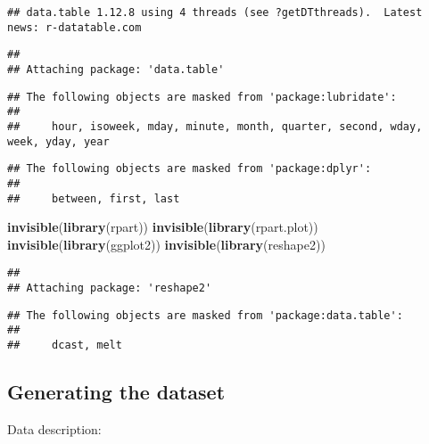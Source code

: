 \documentclass[
]{article}
\newenvironment{Shaded}{\begin{snugshade}}{\end{snugshade}}
\newcommand{\KeywordTok}[1]{\textcolor[rgb]{0.13,0.29,0.53}{\textbf{#1}}}
\newcommand{\NormalTok}[1]{#1}
\begin{document}
\begin{verbatim}
## data.table 1.12.8 using 4 threads (see ?getDTthreads).  Latest news: r-datatable.com
\end{verbatim}

\begin{verbatim}
## 
## Attaching package: 'data.table'
\end{verbatim}

\begin{verbatim}
## The following objects are masked from 'package:lubridate':
## 
##     hour, isoweek, mday, minute, month, quarter, second, wday, week, yday, year
\end{verbatim}

\begin{verbatim}
## The following objects are masked from 'package:dplyr':
## 
##     between, first, last
\end{verbatim}

\begin{Shaded}
\begin{Highlighting}[]
\KeywordTok{invisible}\NormalTok{(}\KeywordTok{library}\NormalTok{(rpart))}
\KeywordTok{invisible}\NormalTok{(}\KeywordTok{library}\NormalTok{(rpart.plot))}
\KeywordTok{invisible}\NormalTok{(}\KeywordTok{library}\NormalTok{(ggplot2))}
\KeywordTok{invisible}\NormalTok{(}\KeywordTok{library}\NormalTok{(reshape2))}
\end{Highlighting}
\end{Shaded}

\begin{verbatim}
## 
## Attaching package: 'reshape2'
\end{verbatim}

\begin{verbatim}
## The following objects are masked from 'package:data.table':
## 
##     dcast, melt
\end{verbatim}

\hypertarget{generating-the-dataset}{%
\subsection{Generating the dataset}\label{generating-the-dataset}}

Data description:
\end{document}
